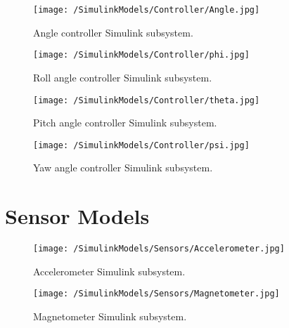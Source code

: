 \begin{figure}[htb]
\begin{center}
	\texttt{[image: /SimulinkModels/Controller/Angle.jpg]}%
	\end{center}
	\caption{Angle controller Simulink subsystem.}%
\end{figure}

\begin{figure}[htb]
\begin{center}
	\texttt{[image: /SimulinkModels/Controller/phi.jpg]}%
	\end{center}
	\caption{Roll angle controller Simulink subsystem.}%
\end{figure}

\begin{figure}[htb]
\begin{center}
	\texttt{[image: /SimulinkModels/Controller/theta.jpg]}%
	\end{center}
	\caption{Pitch angle controller Simulink subsystem.}%
\end{figure}

\begin{figure}[htb]
\begin{center}
	\texttt{[image: /SimulinkModels/Controller/psi.jpg]}%
	\end{center}
	\caption{Yaw angle controller Simulink subsystem.}%
\end{figure}

\clearpage

\FloatBarrier
\section{Sensor Models}\label{appendix:Simu_Sensor}

\begin{figure}[htb]
\begin{center}
	\texttt{[image: /SimulinkModels/Sensors/Accelerometer.jpg]}%
	\end{center}
	\caption{Accelerometer Simulink subsystem.}%
\end{figure}

\begin{figure}[htb]
\begin{center}
	\texttt{[image: /SimulinkModels/Sensors/Magnetometer.jpg]}%
	\end{center}
	\caption{Magnetometer Simulink subsystem.}%
\end{figure}

